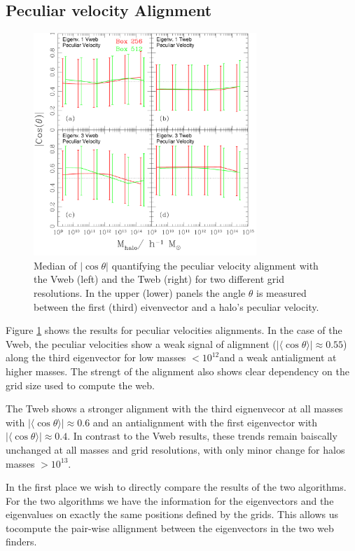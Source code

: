 \documentclass[useAMS,usenatbib]{mn2e}
\newcommand{\hMsun}{{\ifmmode{h^{-1}{\rm
        {M_{\odot}}}}\else{$h^{-1}{\rm{M_{\odot}}}$~}\fi}}
\newcommand{\Msun}{{\ifmmode{{\rm {M_{\odot}}}}\else{${\rm{M_{\odot}}}$}\fi}}
\newcommand{\muavg}{\vert\langle\cos\theta\rangle\vert}
\begin{document}
\subsection{Peculiar velocity Alignment}

\begin{figure}
\includegraphics[width=0.75\textwidth]{Fig4.pdf}
\caption{Median of $\vert\cos\theta\vert$ quantifying the peculiar velocity
  alignment with the Vweb (left) and the Tweb (right) for two different
  grid resolutions. In the upper (lower) panels the angle $\theta$ is
  measured between the first (third) eivenvector and a halo's peculiar
  velocity.
\label{fig:velocity_alignment}} 
\end{figure}

Figure \ref{fig:velocity_alignment} shows the results for peculiar
velocities alignments. In the case of the Vweb, the peculiar
velocities show a weak signal of aligmnent ($\muavg\approx0.55$)
along the third eigenvector for low masses $<10^{12}$\Msun and a weak
antialigment at higher masses. The strengt of the alignment also shows
clear dependency on the grid size used to compute the web.

The Tweb shows a stronger alignment with the third eignenvecor at all
masses with $\muavg\approx0.6$ and an antialignment with the first
eigenvector with $\muavg\approx 0.4$. In contrast to the Vweb results,
these trends remain baiscally unchanged at all masses and grid
resolutions, with only minor change for halos masses $>10^{13}$\hMsun.


In the first place we wish to directly compare the results of the two
algorithms. For the two algorithms we have the information for the
eigenvectors and the eigenvalues on exactly the same positions defined
by the grids. This allows us tocompute the pair-wise allignment
between the eigenvectors in the two web finders. 
\end{document}
